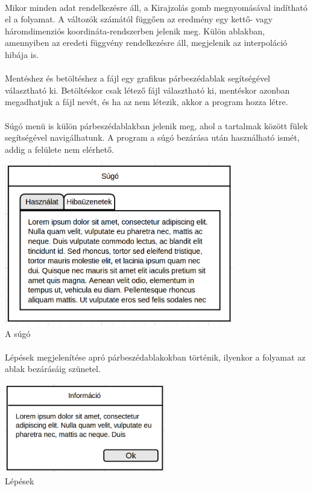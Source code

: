 \documentclass[12pt]{report}
\begin{document}
\paragraph{}
Mikor minden adat rendelkezésre áll, a Kirajzolás gomb megnyomásával indítható el a folyamat. A változók számától függően az eredmény egy kettő- vagy háromdimenziós koordináta-rendszerben jelenik meg. Külön ablakban, amennyiben az eredeti függvény rendelkezésre áll, megjelenik az interpoláció hibája is.

\paragraph{}
Mentéshez és betöltéshez a fájl egy grafikus párbeszédablak segítségével választható ki. Betöltéskor csak létező fájl választható ki, mentéskor azonban megadhatjuk a fájl nevét, és ha az nem létezik, akkor a program hozza létre.
\paragraph{}
Súgó menü is külön párbeszédablakban jelenik meg, ahol a tartalmak között fülek segítségével navigálhatunk. A program a súgó bezárása után használható ismét, addig a felülete nem  elérhető.
\begin{center}
\includegraphics[width=10cm]{pics/graphics/help} \\
{\footnotesize A súgó}
\end{center}
\paragraph{}
Lépések megjelenítése apró párbeszédablakokban történik, ilyenkor a folyamat az ablak bezárásáig szünetel.
\begin{center}
\includegraphics[width=7cm]{pics/graphics/steps} \\
{\footnotesize Lépések}
\end{center}
\end{document}
